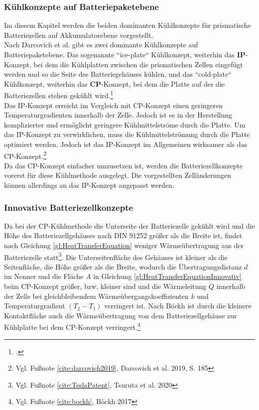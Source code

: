 \subsubsection{Kühlkonzepte auf Batteriepaketebene}\label{subsub:coolingforBatterypacks}

Im diesem Kapitel werden die beiden dominanten Kühlkonzepte für prismatische Batteriezellen auf Akkumulatorebene vorgestellt.\\
Nach Darcovich et al. gibt es zwei dominante Kühlkonzepte auf Batteriepaketebene. Das sogenannte ``ice-plate`` Kühlkonzept, weiterhin das \textbf{IP}-Konzept, bei dem die Kühlplatten zwischen die prismatischen Zellen eingefügt werden und so die Seite des Batteriegehäuses kühlen, und das ``cold-plate`` Kühlkonzept, weiterhin das \textbf{CP}-Konzept, bei dem die Platte auf der die Batteriezellen stehen gekühlt wird.\footcite[Vgl.\label{cite:darcovich2019}][S. 186-187]{Darcovich.2019}\\
Das IP-Konzept erreicht im Vergleich mit CP-Konzept einen geringeren Temperaturgradienten innerhalb der Zelle. Jedoch ist es in der Herstellung komplizierter und ermöglicht geringere Kühlmittelströme durch die Platte. Um das IP-Konzept zu verwirklichen, muss die Kühlmittelströmung durch die Platte optimiert werden. Jedoch ist das IP-Konzept im Allgemeinen wirksamer als das CP-Konzept.\footnote{Vgl. Fußnote \ref{cite:darcovich2019}, Darcovich et al. 2019, S. 185}\\
Da das CP-Konzept einfacher umzusetzen ist, werden die Batteriezellkonzepte vorerst für diese Kühlmethode ausgelegt. Die vorgestellten Zelländerungen können allerdings an das IP-Konzept angepasst werden. \\


\subsubsection{Innovative Batteriezellkonzepte}\label{subsub:innovativeBatteriezellkonzepte}

Da bei der CP-Kühlmethode die Unterseite der Batteriezelle gekühlt wird und die Höhe des Batteriezellgehäuses nach DIN 91252 größer als die Breite ist, findet nach Gleichung \ref{gl:HeatTransferEquation} weniger Wärmeübertragung aus der Batteriezelle statt\footnote{Vgl. Fußnote \ref{cite:TeslaPatent}, Tsuruta et al. 2020}. Die Unterseitenfläche des Gehäuses ist kleiner als die Seitenfläche, die Höhe größer als die Breite, wodurch die Übertragungsdistanz  $d$ im Nenner und die Fläche $A$ in Gleichung \ref{gl:HeatTransferEquationInnovativ} beim CP-Konzept größer, bzw. kleiner sind und die Wärmeleitung $\dot{Q}$ innerhalb der Zelle bei gleichbleibendem Wärmeübergangskoeffizienten $k$ und Temperaturgradient $(T_{2} - T_{1})$ verringert ist. Nach Böckh ist durch die kleinere Kontaktfläche auch die Wärmeübertragung von dem Batteriezellgehäuse zur Kühlplatte bei dem CP-Konzept verringert.\footnote{Vgl. Fußnote \ref{cite:bockh}, Böckh 2017}\\

